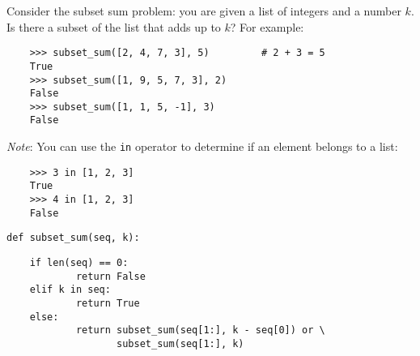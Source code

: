\question Consider the subset sum problem: you are given a list
of integers and a number $k$. Is there a subset of the list that
adds up to $k$? For example:

\begin{lstlisting}
    >>> subset_sum([2, 4, 7, 3], 5)         # 2 + 3 = 5
    True
    >>> subset_sum([1, 9, 5, 7, 3], 2)
    False
    >>> subset_sum([1, 1, 5, -1], 3)
    False
\end{lstlisting}

{\it Note}: You can use the {\tt in} operator to determine if
an element belongs to a list:
\begin{lstlisting}
    >>> 3 in [1, 2, 3]
    True
    >>> 4 in [1, 2, 3]
    False
\end{lstlisting}

\begin{lstlisting}
def subset_sum(seq, k):
\end{lstlisting}
\begin{solution}[1.7in]
\begin{lstlisting}
    if len(seq) == 0:
            return False
    elif k in seq:
            return True
    else:
            return subset_sum(seq[1:], k - seq[0]) or \
                   subset_sum(seq[1:], k)
\end{lstlisting}
\end{solution}
